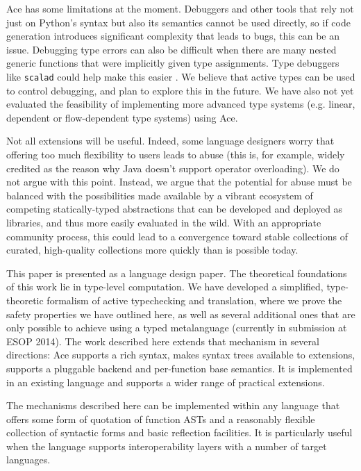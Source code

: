 \documentclass[10pt,preprint]{sigplanconf}
\begin{document}
{Ace has some limitations at the moment. Debuggers and other tools that rely not just on Python's syntax but also its semantics cannot be used directly, so if code generation introduces significant complexity that leads to bugs, this can be an issue. Debugging type errors can also be difficult when there are many nested generic functions that were implicitly given type assignments. Type debuggers like \verb|scalad| could help make this easier \cite{scalad}. We believe that active types can be used to control debugging, and plan to explore this in the future. We have also not yet evaluated the feasibility of implementing more advanced type systems (e.g. linear, dependent or flow-dependent type systems) using Ace.

Not all extensions will be useful. Indeed, some language designers worry that offering too much flexibility to users leads to abuse (this is, for example, widely credited as the reason why Java doesn't support operator overloading). We do not argue with this point. Instead, we argue that the potential for abuse must be balanced with the possibilities made available by a vibrant ecosystem of competing statically-typed abstractions that can be developed and deployed as libraries, and thus more easily evaluated in the wild. With an appropriate community process, this could lead to a convergence toward stable collections of curated, high-quality collections more quickly than is possible today. %
 
This paper is presented as a language design paper. The theoretical foundations of this work lie in type-level computation. We have developed a simplified, type-theoretic formalism of active typechecking and translation, where we prove the safety properties we have outlined here, as well as several additional ones that are only possible to achieve using a typed metalanguage (currently in submission at ESOP 2014). The work described here  extends that mechanism in several directions: Ace supports a rich syntax, makes syntax trees available to extensions, supports a pluggable backend and per-function base semantics. It is implemented in an existing language and supports a wider range of practical extensions. 

The mechanisms described here can be implemented within any language that offers some form of quotation of function ASTs and a reasonably flexible collection of syntactic forms and basic reflection facilities. It is particularly useful when the language supports interoperability layers with a number of target languages. 

}
\end{document}
